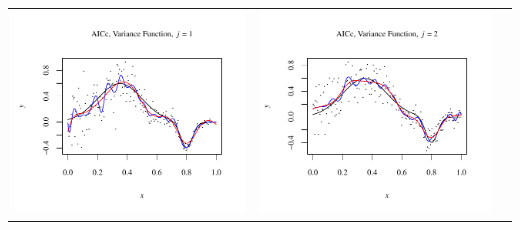\documentclass[11pt]{article}
\begin{document}
\begin{table}[h!]
  \begin{center}
    \renewcommand{\arraystretch}{1.5}
    \begin{tabular}{| >{\centering\arraybackslash}m{2.1in} |  >{\centering\arraybackslash}m{2.1in} |  >{\centering\arraybackslash}m{2.1in}|}
      \hline
      \includegraphics[width=1\linewidth,height=0.18\textheight]{Graphs/3/4/assignment5_a_3_4_1}&
      \includegraphics[width=1\linewidth,height=0.18\textheight]{Graphs/3/4/assignment5_a_3_4_2}&

\end{tabular}
\end{center}
\end{table}
\end{document}
